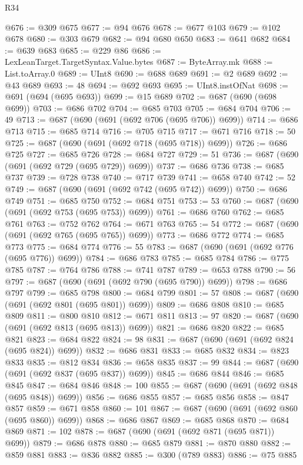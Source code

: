 \begin{lexlean}{R34}
\begin{coremodule}
@676 := @309 @675
@677 := @94 @676
@678 := @677 @103
@679 := @102 @678
@680 := @303 @679
@682 := @94 @680 @650
@683 := @641 @682
@684 := @639 @683
@685 := @229 @86
@686 := LexLeanTarget.TargetSyntax.Value.bytes
@687 := ByteArray.mk
@688 := List.toArray.{0}
@689 := UInt8
@690 := @688 @689
@691 := @2 @689
@692 := @43 @689
@693 := 48
@694 := @692 @693
@695 := UInt8.instOfNat
@698 := @691 (@694 (@695 @693))
@699 := @15 @689
@702 := @687 (@690 (@698 @699))
@703 := @686 @702
@704 := @685 @703
@705 := @684 @704
@706 := 49
@713 := @687 (@690 (@691 (@692 @706 (@695 @706)) @699))
@714 := @686 @713
@715 := @685 @714
@716 := @705 @715
@717 := @671 @716
@718 := 50
@725 := @687 (@690 (@691 (@692 @718 (@695 @718)) @699))
@726 := @686 @725
@727 := @685 @726
@728 := @684 @727
@729 := 51
@736 := @687 (@690 (@691 (@692 @729 (@695 @729)) @699))
@737 := @686 @736
@738 := @685 @737
@739 := @728 @738
@740 := @717 @739
@741 := @658 @740
@742 := 52
@749 := @687 (@690 (@691 (@692 @742 (@695 @742)) @699))
@750 := @686 @749
@751 := @685 @750
@752 := @684 @751
@753 := 53
@760 := @687 (@690 (@691 (@692 @753 (@695 @753)) @699))
@761 := @686 @760
@762 := @685 @761
@763 := @752 @762
@764 := @671 @763
@765 := 54
@772 := @687 (@690 (@691 (@692 @765 (@695 @765)) @699))
@773 := @686 @772
@774 := @685 @773
@775 := @684 @774
@776 := 55
@783 := @687 (@690 (@691 (@692 @776 (@695 @776)) @699))
@784 := @686 @783
@785 := @685 @784
@786 := @775 @785
@787 := @764 @786
@788 := @741 @787
@789 := @653 @788
@790 := 56
@797 := @687 (@690 (@691 (@692 @790 (@695 @790)) @699))
@798 := @686 @797
@799 := @685 @798
@800 := @684 @799
@801 := 57
@808 := @687 (@690 (@691 (@692 @801 (@695 @801)) @699))
@809 := @686 @808
@810 := @685 @809
@811 := @800 @810
@812 := @671 @811
@813 := 97
@820 := @687 (@690 (@691 (@692 @813 (@695 @813)) @699))
@821 := @686 @820
@822 := @685 @821
@823 := @684 @822
@824 := 98
@831 := @687 (@690 (@691 (@692 @824 (@695 @824)) @699))
@832 := @686 @831
@833 := @685 @832
@834 := @823 @833
@835 := @812 @834
@836 := @658 @835
@837 := 99
@844 := @687 (@690 (@691 (@692 @837 (@695 @837)) @699))
@845 := @686 @844
@846 := @685 @845
@847 := @684 @846
@848 := 100
@855 := @687 (@690 (@691 (@692 @848 (@695 @848)) @699))
@856 := @686 @855
@857 := @685 @856
@858 := @847 @857
@859 := @671 @858
@860 := 101
@867 := @687 (@690 (@691 (@692 @860 (@695 @860)) @699))
@868 := @686 @867
@869 := @685 @868
@870 := @684 @869
@871 := 102
@878 := @687 (@690 (@691 (@692 @871 (@695 @871)) @699))
@879 := @686 @878
@880 := @685 @879
@881 := @870 @880
@882 := @859 @881
@883 := @836 @882
@885 := @300 (@789 @883)
@886 := @75 @885

\end{coremodule}
\end{lexlean}

